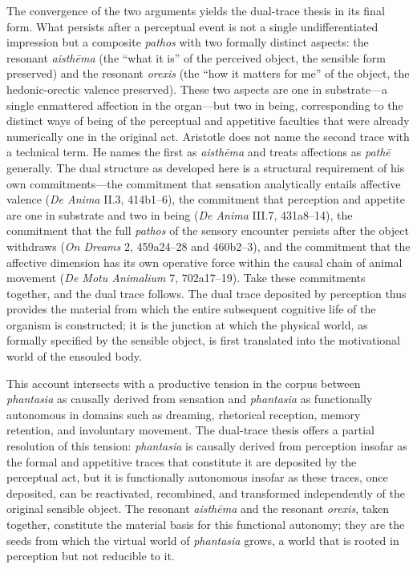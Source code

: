 \documentclass[12pt]{article}
\begin{document}
The convergence of the two arguments yields the dual-trace thesis in its final form. What persists after a perceptual event is not a single undifferentiated impression but a composite \textit{pathos} with two formally distinct aspects: the resonant \textit{aisthēma} (the ``what it is'' of the perceived object, the sensible form preserved) and the resonant \textit{orexis} (the ``how it matters for me'' of the object, the hedonic-orectic valence preserved). These two aspects are one in substrate---a single enmattered affection in the organ---but two in being, corresponding to the distinct ways of being of the perceptual and appetitive faculties that were already numerically one in the original act. Aristotle does not name the second trace with a technical term. He names the first as \textit{aisthēma} and treats affections as \textit{pathē} generally. The dual structure as developed here is a structural requirement of his own commitments---the commitment that sensation analytically entails affective valence (\textit{De Anima} II.3, 414b1--6), the commitment that perception and appetite are one in substrate and two in being (\textit{De Anima} III.7, 431a8--14), the commitment that the full \textit{pathos} of the sensory encounter persists after the object withdraws (\textit{On Dreams} 2, 459a24--28 and 460b2--3), and the commitment that the affective dimension has its own operative force within the causal chain of animal movement (\textit{De Motu Animalium} 7, 702a17--19). Take these commitments together, and the dual trace follows. The dual trace deposited by perception thus provides the material from which the entire subsequent cognitive life of the organism is constructed; it is the junction at which the physical world, as formally specified by the sensible object, is first translated into the motivational world of the ensouled body.

This account intersects with a productive tension in the corpus between \textit{phantasia} as causally derived from sensation and \textit{phantasia} as functionally autonomous in domains such as dreaming, rhetorical reception, memory retention, and involuntary movement. The dual-trace thesis offers a partial resolution of this tension: \textit{phantasia} is causally derived from perception insofar as the formal and appetitive traces that constitute it are deposited by the perceptual act, but it is functionally autonomous insofar as these traces, once deposited, can be reactivated, recombined, and transformed independently of the original sensible object. The resonant \textit{aisthēma} and the resonant \textit{orexis}, taken together, constitute the material basis for this functional autonomy; they are the seeds from which the virtual world of \textit{phantasia} grows, a world that is rooted in perception but not reducible to it.
\end{document}
